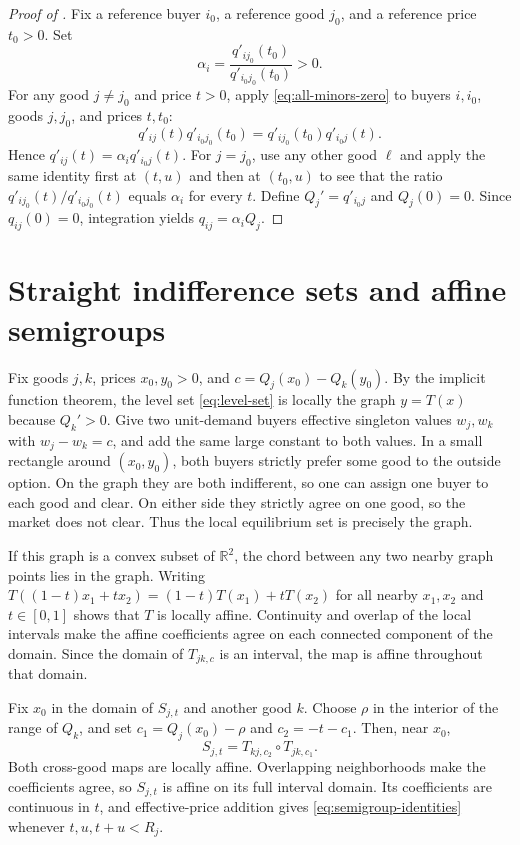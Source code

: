\documentclass[11pt,a4paper,fleqn]{article}
\theoremstyle{plain}
\theoremstyle{definition}
\newcommand{\R}{\mathbb{R}}
\begin{document}
\begin{proof}[Proof of ]
Fix a reference buyer $i_0$, a reference good $j_0$, and a reference price $t_0>0$. Set
\[
\alpha_i=\frac{q'_{ij_0}(t_0)}{q'_{i_0j_0}(t_0)}>0.
\]
For any good $j\ne j_0$ and price $t>0$, apply \eqref{eq:all-minors-zero} to buyers $i,i_0$, goods $j,j_0$, and prices $t,t_0$:
\[
q'_{ij}(t)q'_{i_0j_0}(t_0)
=q'_{ij_0}(t_0)q'_{i_0j}(t).
\]
Hence $q'_{ij}(t)=\alpha_iq'_{i_0j}(t)$. For $j=j_0$, use any other good $\ell$ and apply the same identity first at $(t,u)$ and then at $(t_0,u)$ to see that the ratio $q'_{ij_0}(t)/q'_{i_0j_0}(t)$ equals $\alpha_i$ for every $t$. Define $Q_j'=q'_{i_0j}$ and $Q_j(0)=0$. Since $q_{ij}(0)=0$, integration yields $q_{ij}=\alpha_iQ_j$.
\end{proof}

\section{Straight indifference sets and affine semigroups}\label{app:straight-level}

Fix goods $j,k$, prices $x_0,y_0>0$, and $c=Q_j(x_0)-Q_k(y_0)$. By the implicit function theorem, the level set \eqref{eq:level-set} is locally the graph $y=T(x)$ because $Q_k'>0$. Give two unit-demand buyers effective singleton values $w_j,w_k$ with $w_j-w_k=c$, and add the same large constant to both values. In a small rectangle around $(x_0,y_0)$, both buyers strictly prefer some good to the outside option. On the graph they are both indifferent, so one can assign one buyer to each good and clear. On either side they strictly agree on one good, so the market does not clear. Thus the local equilibrium set is precisely the graph.

If this graph is a convex subset of $\R^2$, the chord between any two nearby graph points lies in the graph. Writing $T((1-t)x_1+tx_2)=(1-t)T(x_1)+tT(x_2)$ for all nearby $x_1,x_2$ and $t\in[0,1]$ shows that $T$ is locally affine. Continuity and overlap of the local intervals make the affine coefficients agree on each connected component of the domain. Since the domain of $T_{jk,c}$ is an interval, the map is affine throughout that domain.

Fix $x_0$ in the domain of $S_{j,t}$ and another good $k$. Choose $\rho$ in the interior of the range of $Q_k$, and set $c_1=Q_j(x_0)-\rho$ and $c_2=-t-c_1$. Then, near $x_0$,
\begin{equation}\label{eq:translation-composition}
S_{j,t}=T_{kj,c_2}\circ T_{jk,c_1}.
\end{equation}
Both cross-good maps are locally affine. Overlapping neighborhoods make the coefficients agree, so $S_{j,t}$ is affine on its full interval domain. Its coefficients are continuous in $t$, and effective-price addition gives \eqref{eq:semigroup-identities} whenever $t,u,t+u<R_j$.
\end{document}
